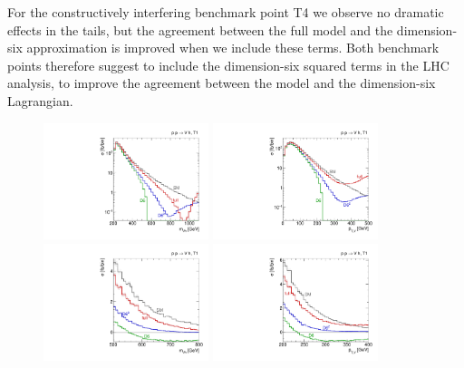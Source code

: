 For the constructively interfering benchmark point T4 we observe no
dramatic effects in the tails, but the agreement between the full
model and the dimension-six approximation is improved when we include
these terms. Both benchmark points therefore suggest to include the
dimension-six squared terms in the LHC analysis, to improve the
agreement between the model and the dimension-six Lagrangian.

\begin{figure}[t]
  \includegraphics[width=0.43\textwidth]{fig/validity/VH_T1_mVH.pdf}
  \hspace*{0.05\textwidth}
  \includegraphics[width=0.43\textwidth]{fig/validity/VH_T1_Vpt.pdf} \\
  \includegraphics[width=0.43\textwidth]{fig/validity/VH_T1_mVH_zoom.pdf} 
  \hspace*{0.05\textwidth}
  \includegraphics[width=0.43\textwidth]{fig/validity/VH_T1_Vpt_zoom} \\

\end{figure}
